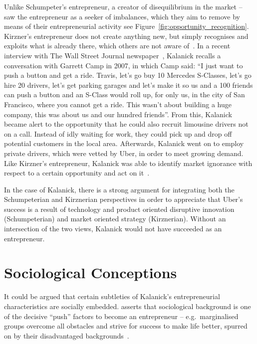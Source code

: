     Unlike Schumpeter's entrepreneur, a creator of disequilibrium in the market --\parencite{kirzner1973entrepreneurship} saw the entrepreneur as a seeker of imbalances, which they aim to remove by means of their entrepreneurial activity see Figure~\ref{fig:opportunity_recognition}. Kirzner's entrepreneur does not create anything new, but simply recognises and exploits what is already there, which others are not aware of~\parencite{landstrom2010entrepreneurship}. In a recent interview with The Wall Street Journal newspaper~\parencite{kessler2013}, Kalanick recalls a conversation with Garrett Camp in 2007, in which Camp said: ``I just want to push a button and get a ride. Travis, let's go buy 10 Mercedes S-Classes, let's go hire 20 drivers, let's get parking garages and let's make it so us and a 100 friends can push a button and an S-Class would roll up, for only us, in the city of San Francisco, where you cannot get a ride. This wasn't about building a huge company, this was about us and our hundred friends''. From this, Kalanick became alert to the opportunity that he could also recruit limousine drivers not on a call. Instead of idly waiting for work, they could pick up and drop off potential customers in the local area. Afterwards, Kalanick went on to employ private drivers, which were vetted by Uber, in order to meet growing demand. Like Kirzner's entrepreneur, Kalanick was able to identify market ignorance with respect to a certain opportunity and act on it~\parencite{hindle2011handbookofresearch}.

    In the case of Kalanick, there is a strong argument for integrating both the Schumpeterian and Kirznerian perspectives in order to appreciate that Uber's success is a result of technology and product oriented disruptive innovation (Schumpeterian) and market oriented strategy (Kirznerian). Without an intersection of the two views, Kalanick would not have succeeded as an entrepreneur.

  \section{Sociological Conceptions}\label{sec:sociological_sonceptions}

    It could be argued that certain subtleties of Kalanick's entrepreneurial characteristics are socially embedded. \cite{reynolds1991} asserts that sociological background is one of the decisive ``push'' factors to become an entrepreneur -- e.g.\ marginalised groups overcome all obstacles and strive for success to make life better, spurred on by their disadvantaged backgrounds~\parencite{simpeh2011}.

